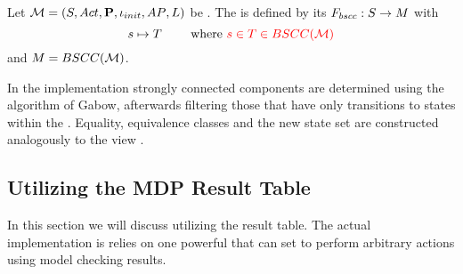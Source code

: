 \documentclass[preview]{standalone}
\begin{document}

\begin{definition}
	Let ${{{\mathcal{M}}}} = {{({S}, {Act}, {\textbf{P}}, {\iota_{init}}, {AP}, {L})}}$ be \achgphN. The \viewN \viewbscc is defined by its \grpfctN ${{F_{bscc}}} : {S} \to {\ensuremath{{M}}}$ with
	\[
	\state \mapsto \scc \quad \quad \text{ where } \redcomment{\state \in \scc \in \setbscc}
	\]
	and ${{M}} = {BSCC({{{\mathcal{M}}}})}$.
\end{definition}

In the implementation strongly connected components are determined using the algorithm of Gabow, afterwards filtering those \sccsN that have only transitions to states within the \sccN. Equality, equivalence classes and the new state set are constructed analogously to the view \viewscc.

\subsection{Utilizing the MDP Result Table}
In this section we will discuss \viewsN utilizing the result table. The actual implementation is relies on one powerful \viewN that can set to perform arbitrary actions using model checking results.

\end{document}
